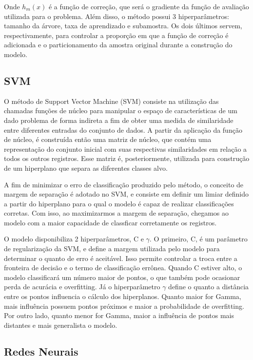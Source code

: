 \documentclass{homework}
\begin{document}
Onde $h_m(x)$ é a função de correção, que será o gradiente da função de avaliação utilizada para o problema. Além disso,
o método possui 3 hiperparâmetros: tamanho da árvore, taxa de aprendizado e subamostra. Os dois últimos servem,
respectivamente, para controlar a proporção em que a função de correção é adicionada e o particionamento da amostra
original durante a construção do modelo.

\subsection{SVM}

O método de Support Vector Machine (SVM) consiste na utilização das chamadas funções de núcleo para manipular o espaço
de características de um dado problema de forma indireta a fim de obter uma medida de similaridade entre diferentes
entradas do conjunto de dados. A partir da aplicação da função de núcleo, é construída então uma matriz de núcleo, que
contém uma representação do conjunto inicial com suas respectivas similaridades em relação a todos os outros registros.
Esse matriz é, posteriormente, utilizada para construção de um hiperplano que separa as diferentes classes alvo.

A fim de minimizar o erro de classificação produzido pelo método, o conceito de margem de separação é adotado no SVM, e
consiste em definir um limiar definido a partir do hiperplano para o qual o modelo é capaz de realizar classificações
corretas. Com isso, ao maximizarmos a margem de separação, chegamos ao modelo com a maior capacidade de classficar
corretamente os registros.

O modelo disponibiliza 2 hiperparâmetros, C e $\gamma$. O primeiro, C, é um parâmetro de regularização da SVM, e define a
margem utilizada pelo modelo para determinar o quanto de erro é aceitável. Isso permite controlar a troca entre a
fronteira de decisão e o termo de classificação errônea. Quando C estiver alto, o modelo classificará um número maior de
pontos, o que também pode ocasionar perda de acurácia e overfitting. Já o hiperparâmetro $\gamma$ define o quanto a
distância entre os pontos influencia o cálculo dos hiperplanos. Quanto maior for Gamma, mais influência possuem pontos
próximos e maior a probabilidade de overfitting. Por outro lado, quanto menor for Gamma, maior a influência de pontos
mais distantes e mais generalista o modelo.

\subsection{Redes Neurais}
\end{document}
